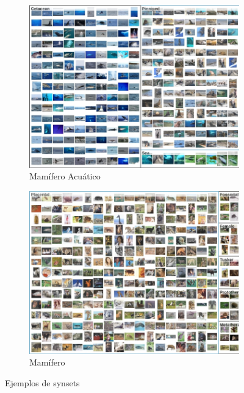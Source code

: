 \documentclass[12,twoside]{TFG-GM}
\theoremstyle{definition}
\theoremstyle{remark}
\begin{document}
\begin{figure}[H] 
	\centering
	\begin{subfigure}[b]{0.43\textwidth}
		
		\includegraphics[width=\textwidth] {Images/imagenet/aquatic_mamal.png}
		\caption{Mamífero Acuático \label{fig:aquaticmammal}}
	\end{subfigure}
	\begin{subfigure}[b]{0.43\textwidth}
		\includegraphics[width=\textwidth]{Images/imagenet/mammal.png}
		\caption{Mamífero\label{fig:mammal}}
	\end{subfigure}       
	\caption{Ejemplos de synsets\label{fig:wordnetexample}}
\end{figure}
\end{document}
